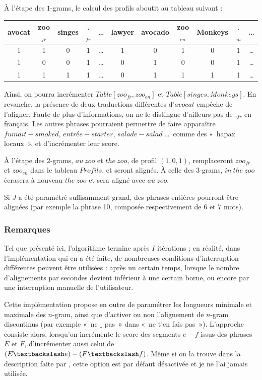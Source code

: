 \documentclass[a4paper,10pt]{article}
\newcommand{\guill}[1]{«~#1~»}
\begin{document}
\`A l'étape des $1$-grams, le calcul des profils aboutit au tableau suivant :

\begin{tabular}{|c|c|c|c|c|c|c|c|c|c|c|}
\hline
avocat & zoo$_{fr}$ & singes & .$_{fr}$ & \dots & lawyer & avocado & zoo$_{en}$ & Monkeys & .$_{en}$ & \dots \\
\hline
1 & 1 & 0 & 1 & \dots & 1 & 0 & 1 & 0 & 1 & \dots \\
1 & 0 & 0 & 1 & \dots & 0 & 1 & 0 & 0 & 1 & \dots \\
1 & 1 & 1 & 1 & \dots & 0 & 1 & 1 & 1 & 1 & \dots \\
\hline
\end{tabular}

Ainsi, on pourra incrémenter $Table[zoo_{fr},zoo_{en}]$ et $Table[singes,Monkeys]$. En revanche, la présence de deux traductions différentes d'$avocat$ empêche de l'aligner. Faute de plus d'informations, on ne le distingue d'ailleurs pas de $._{fr}$ en français. Les autres phrases pourraient permettre de faire apparaître $fumait-smoked$, $entrée-starter$, $salade-salad$ \dots~comme des \guill{hapax locaux}, et d'incrémenter leur score.

\`A l'étape des $2$-grams, $au~zoo$ et $the~zoo$, de profil $(1,0,1)$, remplaceront $zoo_{fr}$ et $zoo_{en}$ dans le tableau $Profils$, et seront alignés. \`A celle des $3$-grams, $in~the~zoo$ écrasera à nouveau $the~zoo$ et sera aligné avec $au~zoo$.

Si $J$ a été paramétré suffisamment grand, des phrases entières pourront être alignées (par exemple la phrase 10, composée respectivement de 6 et 7 mots).



\subsubsection{Remarques}

Tel que présenté ici, l'algorithme termine après $I$ itérations ; en réalité, dans l'implémentation qui en a été faite, de nombreuses conditions d'interruption différentes peuvent être utilisées : après un certain temps, lorsque le nombre d'alignements par secondes devient inférieur à une certain borne, ou encore par une interruption manuelle de l'utilisateur.

Cette implémentation propose en outre de paramétrer les longueurs minimale et maximale des $n$-gram, ainsi que d'activer ou non l'alignement de  $n$-gram discontinus (par exemple \guill{ne $\_$ pas} dans \guill{ne t'en fais pas}). L'approche consiste alors, lorsqu'on incrémente le score des segments $e-f$ issus des phrases $E$ et $F$, d'incrémenter aussi celui de $(E\textbackslash e)-(F\textbackslash f)$. Même si on la trouve dans la description faite par \cite{lardilleux2013generalizing}, cette option est par défaut désactivée et je ne l'ai jamais utilisée.
\end{document}
